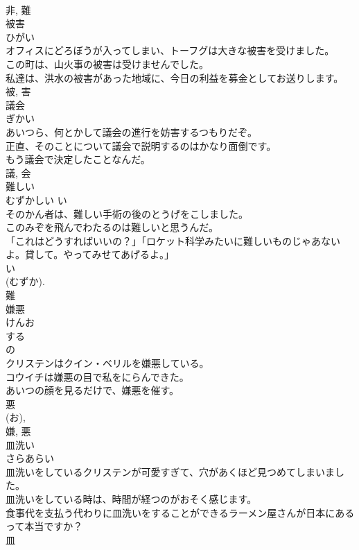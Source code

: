 \documentclass[8pt]{extreport}
\begin{document}
\begin{CJK}{UTF8}{min}
\\	非, 難	
\\	被害	
\\	ひがい	
\\	オフィスにどろぼうが入ってしまい、トーフグは大きな被害を受けました。	
\\	この町は、山火事の被害は受けませんでした。	
\\	私達は、洪水の被害があった地域に、今日の利益を募金としてお送りします。	
\\	被, 害	
\\	議会	
\\	ぎかい	
\\	あいつら、何とかして議会の進行を妨害するつもりだぞ。	
\\	正直、そのことについて議会で説明するのはかなり面倒です。	
\\	もう議会で決定したことなんだ。	
\\	議, 会	
\\	難しい	
\\	むずかしい	い 
\\	そのかん者は、難しい手術の後のとうげをこしました。	
\\	このみぞを飛んでわたるのは難しいと思うんだ。	
\\	「これはどうすればいいの？」「ロケット科学みたいに難しいものじゃあないよ。貸して。やってみせてあげるよ。」	
\\	い 
\\	(むずか). 
\\	難	
\\	嫌悪	
\\	けんお	
\\	する 
\\	の 
\\	クリステンはクイン・ベリルを嫌悪している。	
\\	コウイチは嫌悪の目で私をにらんできた。	
\\	あいつの顔を見るだけで、嫌悪を催す。	
\\	悪 
\\	(お), 
\\	嫌, 悪	
\\	皿洗い	
\\	さらあらい	
\\	皿洗いをしているクリステンが可愛すぎて、穴があくほど見つめてしまいました。	
\\	皿洗いをしている時は、時間が経つのがおそく感じます。	
\\	食事代を支払う代わりに皿洗いをすることができるラーメン屋さんが日本にあるって本当ですか？	
\\	皿 

\end{CJK}
\end{document}
